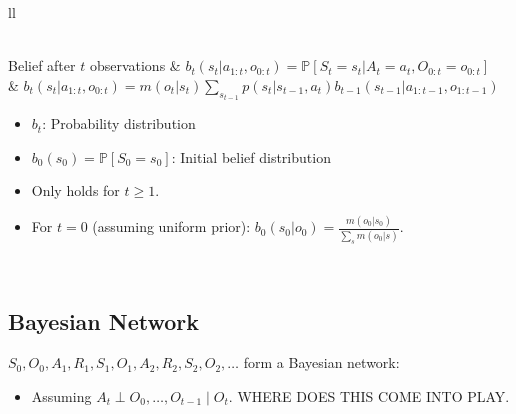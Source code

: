 \begin{summary}
\begin{center}
\begin{tabular}{ll}
{\begin{itemize}
\begin{itemize}
                \end{itemize}
            \end{itemize}
            } \\
            \midrule 
            Belief after $t$ observations &  $b_t(s_t | a_{1:t}, o_{0:t}) = \mathbb{P}[S_t = s_t | A_t = a_t, O_{0:t} = o_{0:t}]$ \\
            & $b_t(s_t | a_{1:t}, o_{0:t}) = m(o_t | s_t) \sum_{s_{t-1}} p(s_t | s_{t-1}, a_t) b_{t-1}(s_{t-1} | a_{1:t-1}, o_{1:t-1})$ \\
            {
            \begin{itemize}
                \item $b_t$: Probability distribution
                \item $b_0(s_0) = \mathbb{P}[S_0 = s_0]$: Initial belief distribution
                \item Only holds for $t \geq 1$.
                \item For $t = 0$ (assuming uniform prior): $b_0(s_0 | o_0) = \frac{m(o_0 | s_0)}{\sum_s m(o_0 | s)}.$
            \end{itemize}
            } \\
            \bottomrule
        \end{tabular}
    \end{center}
\end{summary}

\subsection{Bayesian Network}
\begin{notes}
    $S_0, O_0, A_1, R_1, S_1, O_1, A_2, R_2, S_2, O_2, \dots$ form a Bayesian network:
    \begin{itemize}
        \item Assuming $A_t \perp O_0, \dots, O_{t-1} \mid O_t$. WHERE DOES THIS COME INTO PLAY. 
    \end{itemize}
\end{notes}
\newpage

\begin{example}
    
\end{example}